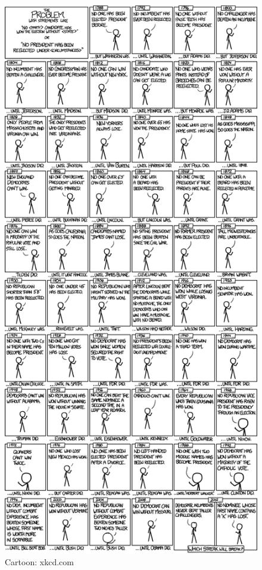 \documentclass[]{article}
\begin{document}
\begin{figure}
\centering
\includegraphics{media/xkcd_presidents_overfitting.png}
\caption{Cartoon: xkcd.com}
\end{figure}
\end{document}
